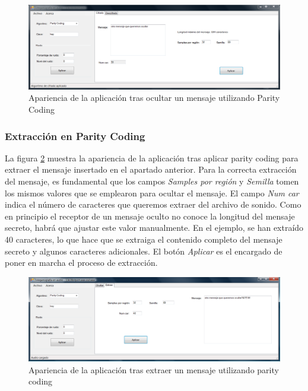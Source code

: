 \documentclass[12pt]{article}
\begin{document}
\begin{figure}[h]
  \centering
    \includegraphics[width=\textwidth]{img/ss4}
  \caption{Apariencia de la aplicación tras ocultar un mensaje utilizando Parity Coding}
  \label{ss4}
\end{figure}

\subsubsection{Extracción en Parity Coding}

La figura \ref{ss5} muestra la apariencia de la aplicación tras aplicar parity coding para extraer el mensaje insertado en el apartado anterior. Para la correcta extracción del mensaje, es fundamental que los campos \emph{Samples por región} y \emph{Semilla} tomen los mismos valores que se emplearon para ocultar el mensaje. El campo \emph{Num car} indica el número de caracteres que queremos extraer del archivo de sonido. Como en principio el receptor de un mensaje oculto no conoce la longitud del mensaje secreto, habrá que ajustar este valor manualmente. En el ejemplo, se han extraído 40 caracteres, lo que hace que se extraiga el contenido completo del mensaje secreto y algunos caracteres adicionales. El botón \emph{Aplicar} es el encargado de poner en marcha el proceso de extracción.

\begin{figure}[h]
  \centering
    \includegraphics[width=\textwidth]{img/ss5}
  \caption{Apariencia de la aplicación tras extraer un mensaje utilizando parity coding}
  \label{ss5}
\end{figure}
\end{document}
